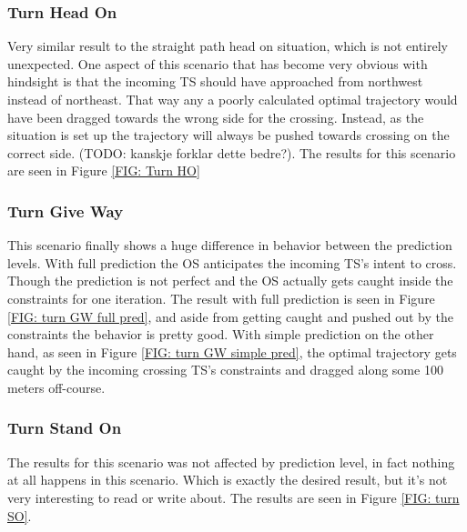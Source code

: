 \clearpage
\subsubsection{Turn Head On}
Very similar result to the straight path head on situation, which is not entirely unexpected. One aspect of this scenario that
has become very obvious with hindsight is that the incoming TS should have approached from northwest instead of northeast. That way
any a poorly calculated optimal trajectory would have been dragged towards the wrong side for the crossing. Instead, as the situation is set
up the trajectory will always be pushed towards crossing on the correct side. (TODO: kanskje forklar dette bedre?).
The results for this scenario are seen in Figure \ref{FIG: Turn HO}

\subsubsection{Turn Give Way}
This scenario finally shows a huge difference in behavior between the prediction levels. With full prediction the OS
anticipates the incoming TS's intent to cross. Though the prediction is not perfect and the OS actually gets caught inside the
constraints for one iteration. The result with full prediction is seen in Figure \ref{FIG: turn GW full pred}, and aside from
getting caught and pushed out by the constraints the behavior is pretty good.
With simple prediction on the other hand, as seen in Figure \ref{FIG: turn GW simple pred}, the optimal trajectory gets caught by the
incoming crossing TS's constraints and dragged along some 100 meters off-course.

\subsubsection{Turn Stand On}
The results for this scenario was not affected by prediction level, in fact nothing at all happens in this scenario. Which is exactly the desired result,
but it's not very interesting to read or write about. The results are seen in Figure \ref{FIG: turn SO}.

